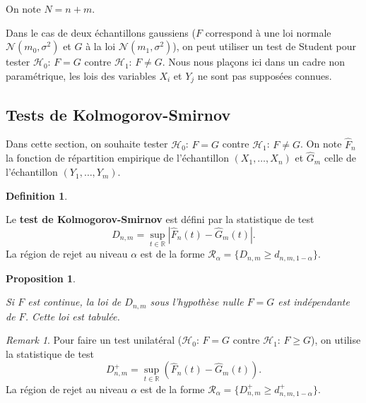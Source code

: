 \documentclass[
]{book}
\newtheorem{proposition}{Proposition}[chapter]
\theoremstyle{definition}
\newtheorem{definition}{Definition}[chapter]
\theoremstyle{definition}
\theoremstyle{definition}
\theoremstyle{definition}
\theoremstyle{remark}
\newtheorem*{remark}{Remark}
\begin{document}
On note \(N=n+m\).

Dans le cas de deux échantillons gaussiens (\(F\) correspond à une loi normale \(\mathcal{N}(m_0, \sigma^2)\) et \(G\) à la loi \(\mathcal{N}(m_1, \sigma^2)\)), on peut utiliser un test de Student pour tester \(\mathcal{H}_0\): \(F=G\) contre \(\mathcal{H}_1\): \(F \neq G\). Nous nous plaçons ici dans un cadre non paramétrique, les lois des variables \(X_i\) et \(Y_j\) ne sont pas supposées connues.

\hypertarget{tests-de-kolmogorov-smirnov}{%
\subsection{Tests de Kolmogorov-Smirnov}\label{tests-de-kolmogorov-smirnov}}

Dans cette section, on souhaite tester \(\mathcal{H}_0\): \(F=G\) contre \(\mathcal{H}_1\): \(F \neq G\). On note \(\hat F_n\) la fonction de répartition empirique de l'échantillon \((X_1, \ldots, X_n)\) et \(\hat G_m\) celle de l'échantillon \((Y_1, \ldots, Y_m)\).

\begin{definition}
\protect\hypertarget{def:unlabeled-div-24}{}\label{def:unlabeled-div-24}

Le \textbf{test de Kolmogorov-Smirnov} est défini par la statistique de test
\[
    D_{n,m}=\sup_{t \in \mathbb{R}} | \hat F_n(t)- \hat G_m(t)|.
\]
La région de rejet au niveau \(\alpha\) est de la forme \(\mathcal R_{\alpha} = \{ D_{n,m} \geq d_{n,m,1-\alpha} \}\).

\end{definition}

\begin{proposition}
\protect\hypertarget{prp:unlabeled-div-25}{}\label{prp:unlabeled-div-25}

Si \(F\) est continue, la loi de \(D_{n,m}\) sous l'hypothèse nulle \(F=G\) est indépendante de \(F\).
Cette loi est tabulée.

\end{proposition}

\begin{remark}

Pour faire un test unilatéral (\(\mathcal{H}_0\): \(F=G\) contre \(\mathcal{H}_1\): \(F \geq G\)), on utilise la statistique de test
\[ 
    D_{n,m}^+=\sup_{t \in \mathbb{R}} (\hat F_n(t)- \hat G_m(t)).
\]
La région de rejet au niveau \(\alpha\) est de la forme \(\mathcal R_{\alpha} = \{ D^+_{n,m} \geq d^+_{n,m,1-\alpha} \}\).

\end{remark}
\end{document}
